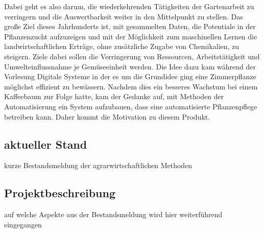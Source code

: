 Dabei geht es also darum, die wiederkehrenden Tätigkeiten der Gartenarbeit zu verringern und die Auswertbarkeit weiter in den Mittelpunkt zu stellen. Das große Ziel dieses Jahrhunderts ist, mit gesammelten Daten, die Potentiale in der Pflanzenzucht aufzuzeigen und mit der Möglichkeit zum maschinellen Lernen die landwirtschaftlichen Erträge, ohne zusätzliche Zugabe von Chemikalien, zu steigern. Ziele dabei sollen die Verringerung von Ressourcen, Arbeitstätigkeit und Umwelteinflussnahme je Gemüseeinheit werden. 
\newline
Die Idee dazu kam während der Vorlesung Digitale Systeme in der es um die Grundidee ging eine Zimmerpflanze möglichst effizient zu bewässern. Nachdem dies ein besseres Wachstum bei einem Kaffeebaum zur Folge hatte, kam der Gedanke auf, mit Methoden der Automatisierung ein System aufzubauen, dass eine automatisierte Pflanzenpflege betreiben kann. Daher kommt die Motivation zu diesem Produkt.
\subsection{aktueller Stand}
kurze Bestandsmeldung der agrarwirtschaftlichen Methoden

\subsection{Projektbeschreibung}
auf welche Aspekte aus der Bestandsmeldung wird hier weiterführend eingegangen
